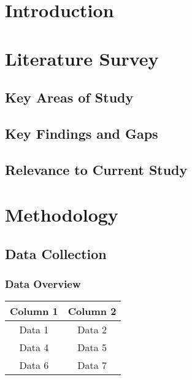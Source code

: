 \documentclass[12pt]{article}
\begin{document}
\section{Introduction}

\section{Literature Survey}


\subsection{Key Areas of Study}

\subsection{Key Findings and Gaps}

\subsection{Relevance to Current Study}

\section{Methodology}
\subsection{Data Collection}

\subsubsection{Data Overview}

\begin{center}
\begin{tabular}{||c|c||}
\hline
\hline
\rowcolor[HTML]{89A8B2} Column 1 & Column 2 \\
\hline
\hline
\rowcolor[HTML]{F8FAFC} Data 1 & Data 2 \\ %
\hline

\rowcolor[HTML]{D8EFD3} Data 4 & Data 5 \\
\hline

\rowcolor[HTML]{F8FAFC} Data 6 & Data 7 \\ %
\hline
\hline
\end{tabular}
\end{center}
\bigskip %
\end{document}

